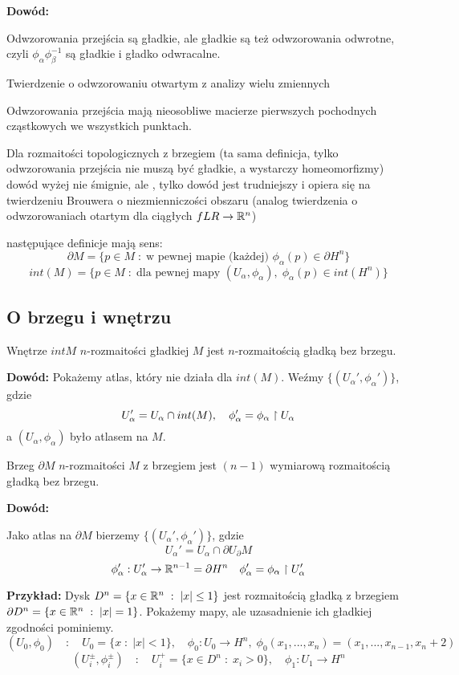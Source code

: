 \textbf{Dowód:}

Odwzorowania przejścia są gładkie, ale gładkie są też odwzorowania odwrotne, czyli $\phi_\alpha\phi_\beta^{-1}$ są gładkie i gładko odwracalne.

Twierdzenie o odwzorowaniu otwartym z analizy wielu zmiennych

Odwzorowania przejścia mają nieosobliwe macierze pierwszych pochodnych cząstkowych we wszystkich punktach.

 Dla rozmaitości topologicznych z brzegiem (ta sama definicja, tylko odwzorowania przejścia nie muszą być gładkie, a wystarczy homeomorfizmy) dowód wyżej nie śmignie, ale , tylko dowód jest trudniejszy i opiera się na twierdzeniu Brouwera o niezmienniczości obszaru (analog twierdzenia o odwzorowaniach otartym dla ciągłych $fLR\to\mathbb{R}^n$)

 następujące definicje mają sens: 
$$\partial M=\{p\in M\;:\;\text{w pewnej mapie (każdej) }\phi_\alpha(p)\in\partial H^n\}$$ 
$$int(M)=\{p\in M\;:\;\text{dla pewnej mapy }(U_\alpha,\phi_\alpha),\;\phi_\alpha(p)\in int(H^n)\}$$

\subsection{O brzegu i wnętrzu}

\begin{fakt}
    Wnętrze $int M$ $n$-rozmaitości gładkiej $M$ jest $n$-rozmaitością gładką bez brzegu.
\end{fakt}

\textbf{Dowód:} Pokażemy atlas, który nie działa dla $int(M)$. Weźmy $\{(U_\alpha',\phi_\alpha')\}$, gdzie
$$U_\alpha'=U_\alpha\cap int(M),\quad \phi_\alpha'=\phi_\alpha\upharpoonright U_\alpha$$
a $(U_\alpha,\phi_\alpha)$ było atlasem na $M$.

\begin{fakt}
    Brzeg $\partial M$ $n$-rozmaitości $M$ z brzegiem jest $(n-1)$ wymiarową rozmaitością gładką bez brzegu.
\end{fakt}

\textbf{Dowód:}

Jako atlas na $\partial M$ bierzemy $\{(U_\alpha',\phi_\alpha')\}$, gdzie 
$$U_\alpha'=U_\alpha\cap\partial U_\partial M$$
$$\phi_\alpha':U_\alpha'\to\mathbb{R}^{n-1}=\partial H^n\quad \phi_\alpha'=\phi_\alpha\upharpoonright U_\alpha'$$

\textbf{Przykład:} Dysk $D^n=\{x\in\mathbb{R}^n\;:\;|x|\leq 1\}$ jest rozmaitością gładką z brzegiem $\partial D^n=\{x\in\mathbb{R}^n\;:\;|x|=1\}$. Pokażemy mapy, ale uzasadnienie ich gładkiej zgodności pominiemy.
$$(U_0,\phi_0)\quad:\quad U_0=\{x\;:\;|x|<1\},\quad\phi_0:U_0\to H^n,\;\phi_0(x_1,...,x_n)=(x_1,...,x_{n-1},x_n+2)$$
$$(U_i^\pm,\phi_i^\pm)\quad:\quad U_i^+=\{x\in D^n\;:\;x_i>0\},\quad\phi_1:U_1\to H^n$$

